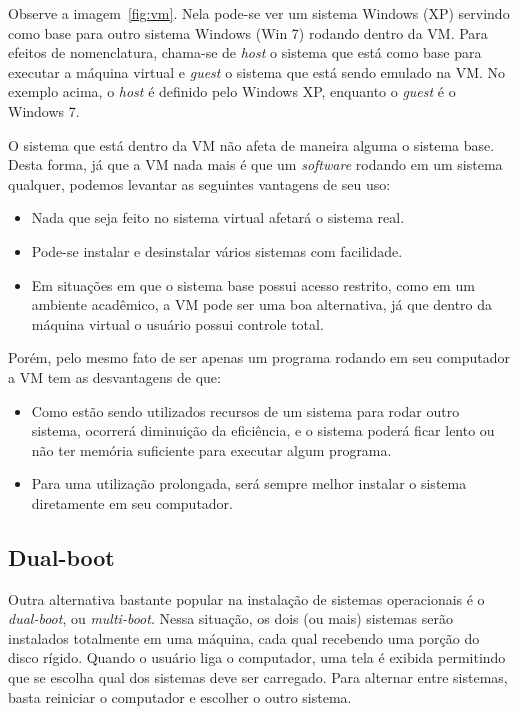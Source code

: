 \documentclass{handout_utfpr}
\begin{document}
Observe a imagem~\ref{fig:vm}. Nela pode-se ver um sistema Windows (XP) servindo como base para outro sistema Windows (Win 7) rodando dentro da VM\@. Para efeitos de nomenclatura, chama-se de \textit{host} o sistema que está como base para executar a máquina virtual e \textit{guest} o sistema que está sendo emulado na VM\@. No exemplo acima, o \textit{host} é definido pelo Windows XP, enquanto o \textit{guest} é o Windows 7.

O sistema que está dentro da VM não afeta de maneira alguma o sistema base. Desta forma, já que a VM nada mais é que um \textit{software} rodando em um sistema qualquer, podemos levantar as seguintes vantagens de seu uso:

\begin{itemize}
\item Nada que seja feito no sistema virtual afetará o sistema real.
\item Pode-se instalar e desinstalar vários sistemas com facilidade.
\item Em situações em que o sistema base possui acesso restrito, como em um ambiente acadêmico, a VM pode ser uma boa alternativa, já que dentro da máquina virtual o usuário possui controle total.
\end{itemize}

Porém, pelo mesmo fato de ser apenas um programa rodando em seu computador a VM tem as desvantagens de que:

\begin{itemize}
\item Como estão sendo utilizados recursos de um sistema para rodar outro sistema, ocorrerá diminuição da eficiência, e o sistema poderá ficar lento ou não ter memória suficiente para executar algum programa.
  \item Para uma utilização prolongada, será sempre melhor instalar o sistema diretamente em seu computador.
\end{itemize}

\subsection{Dual-boot}
Outra alternativa bastante popular na instalação de sistemas operacionais é o \textit{dual-boot}, ou \textit{multi-boot}. Nessa situação, os dois (ou mais) sistemas serão instalados totalmente em uma máquina, cada qual recebendo uma porção do disco rígido. Quando o usuário liga o computador, uma tela é exibida permitindo que se escolha qual dos sistemas deve ser carregado. Para alternar entre sistemas, basta reiniciar o computador e escolher o outro sistema.
\end{document}
